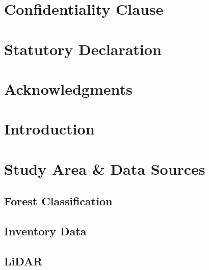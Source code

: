 \documentclass[12pt]{article}
\numberwithin{equation}{section}
\numberwithin{table}{section}
\numberwithin{figure}{section}
\begin{document}
\thispagestyle{empty}	



\newpage
\null\thispagestyle{empty}
\newpage
\thispagestyle{empty}
\section*{Confidentiality Clause}


\newpage
\null\thispagestyle{empty}
\newpage
\thispagestyle{empty}
\section*{Statutory Declaration}




\newpage
\null\thispagestyle{empty}
\newpage
\thispagestyle{empty}
\section*{Acknowledgments}

\newpage
\null\thispagestyle{empty}
\newpage


	
\thispagestyle{empty}
\tableofcontents
\newpage




\newpage

\setcounter{page}{1} 

\section{Introduction}

\clearpage
\section{Study Area \& Data Sources}
\subsection{Forest Classification}

\subsection{Inventory Data} \label{Inventory Data}

\subsection{LiDAR} \label{LiDAR}

\clearpage
\end{document}
